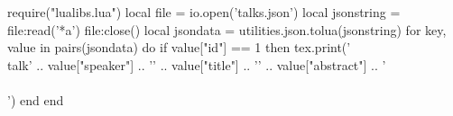 \documentclass[a4paper]{article}
\begin{document}

\begin{luacode}
require("lualibs.lua")
local file = io.open('talks.json')
local jsonstring = file:read('*a')
file:close()
local jsondata =  utilities.json.tolua(jsonstring)
for key, value in pairs(jsondata) do
  if value["id"] == 1 then 
      tex.print('\\talk{' .. 
        value["speaker"]  .. 
        '}{'              .. 
        value["title"]    .. 
        '}{'              .. 
        value["abstract"] .. 
        '}\\\\[1em]')
  end
end
\end{luacode}
 
\end{document}

